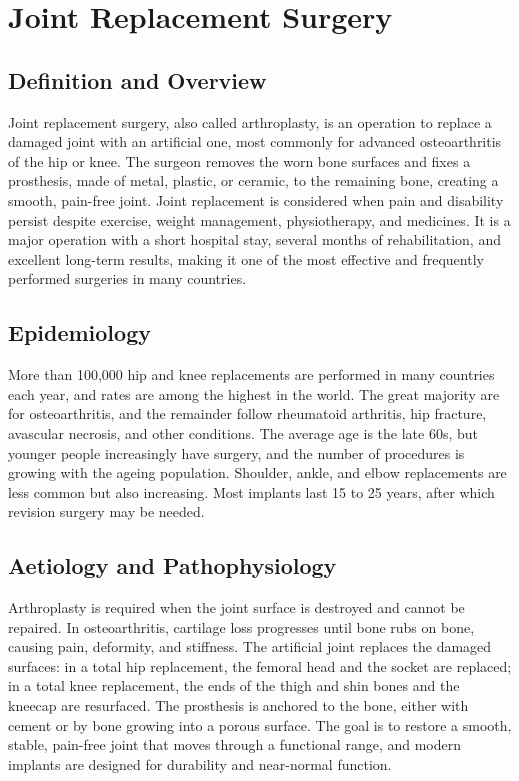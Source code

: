 \chapter{Joint Replacement Surgery}

\section*{Definition and Overview}
Joint replacement surgery, also called arthroplasty, is an operation to replace a damaged joint with an artificial one, most commonly for advanced osteoarthritis of the hip or knee. The surgeon removes the worn bone surfaces and fixes a prosthesis, made of metal, plastic, or ceramic, to the remaining bone, creating a smooth, pain-free joint. Joint replacement is considered when pain and disability persist despite exercise, weight management, physiotherapy, and medicines. It is a major operation with a short hospital stay, several months of rehabilitation, and excellent long-term results, making it one of the most effective and frequently performed surgeries in many countries.

\section*{Epidemiology}
More than 100,000 hip and knee replacements are performed in many countries each year, and rates are among the highest in the world. The great majority are for osteoarthritis, and the remainder follow rheumatoid arthritis, hip fracture, avascular necrosis, and other conditions. The average age is the late 60s, but younger people increasingly have surgery, and the number of procedures is growing with the ageing population. Shoulder, ankle, and elbow replacements are less common but also increasing. Most implants last 15 to 25 years, after which revision surgery may be needed.

\section*{Aetiology and Pathophysiology}
Arthroplasty is required when the joint surface is destroyed and cannot be repaired. In osteoarthritis, cartilage loss progresses until bone rubs on bone, causing pain, deformity, and stiffness. The artificial joint replaces the damaged surfaces: in a total hip replacement, the femoral head and the socket are replaced; in a total knee replacement, the ends of the thigh and shin bones and the kneecap are resurfaced. The prosthesis is anchored to the bone, either with cement or by bone growing into a porous surface. The goal is to restore a smooth, stable, pain-free joint that moves through a functional range, and modern implants are designed for durability and near-normal function.

